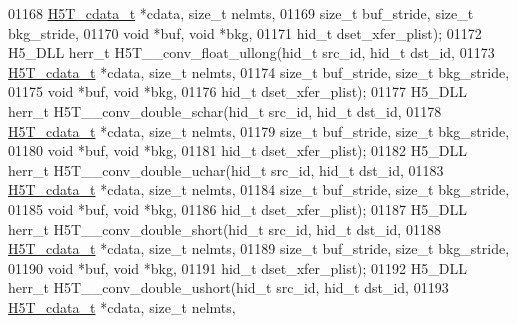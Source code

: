 \begin{DoxyCode}
01168                      \hyperlink{struct_h5_t__cdata__t}{H5T\_cdata\_t} *cdata, \textcolor{keywordtype}{size\_t} nelmts,
01169                      \textcolor{keywordtype}{size\_t} buf\_stride, \textcolor{keywordtype}{size\_t} bkg\_stride,
01170                                      \textcolor{keywordtype}{void} *buf, \textcolor{keywordtype}{void} *bkg,
01171                                      hid\_t dset\_xfer\_plist);
01172 H5\_DLL herr\_t H5T\_\_conv\_float\_ullong(hid\_t src\_id, hid\_t dst\_id,
01173                      \hyperlink{struct_h5_t__cdata__t}{H5T\_cdata\_t} *cdata, \textcolor{keywordtype}{size\_t} nelmts,
01174                      \textcolor{keywordtype}{size\_t} buf\_stride, \textcolor{keywordtype}{size\_t} bkg\_stride,
01175                                      \textcolor{keywordtype}{void} *buf, \textcolor{keywordtype}{void} *bkg,
01176                                      hid\_t dset\_xfer\_plist);
01177 H5\_DLL herr\_t H5T\_\_conv\_double\_schar(hid\_t src\_id, hid\_t dst\_id,
01178                      \hyperlink{struct_h5_t__cdata__t}{H5T\_cdata\_t} *cdata, \textcolor{keywordtype}{size\_t} nelmts,
01179                      \textcolor{keywordtype}{size\_t} buf\_stride, \textcolor{keywordtype}{size\_t} bkg\_stride,
01180                                      \textcolor{keywordtype}{void} *buf, \textcolor{keywordtype}{void} *bkg,
01181                                      hid\_t dset\_xfer\_plist);
01182 H5\_DLL herr\_t H5T\_\_conv\_double\_uchar(hid\_t src\_id, hid\_t dst\_id,
01183                      \hyperlink{struct_h5_t__cdata__t}{H5T\_cdata\_t} *cdata, \textcolor{keywordtype}{size\_t} nelmts,
01184                      \textcolor{keywordtype}{size\_t} buf\_stride, \textcolor{keywordtype}{size\_t} bkg\_stride,
01185                                      \textcolor{keywordtype}{void} *buf, \textcolor{keywordtype}{void} *bkg,
01186                                      hid\_t dset\_xfer\_plist);
01187 H5\_DLL herr\_t H5T\_\_conv\_double\_short(hid\_t src\_id, hid\_t dst\_id,
01188                      \hyperlink{struct_h5_t__cdata__t}{H5T\_cdata\_t} *cdata, \textcolor{keywordtype}{size\_t} nelmts,
01189                      \textcolor{keywordtype}{size\_t} buf\_stride, \textcolor{keywordtype}{size\_t} bkg\_stride,
01190                                      \textcolor{keywordtype}{void} *buf, \textcolor{keywordtype}{void} *bkg,
01191                                      hid\_t dset\_xfer\_plist);
01192 H5\_DLL herr\_t H5T\_\_conv\_double\_ushort(hid\_t src\_id, hid\_t dst\_id,
01193                      \hyperlink{struct_h5_t__cdata__t}{H5T\_cdata\_t} *cdata, \textcolor{keywordtype}{size\_t} nelmts,

\end{DoxyCode}
